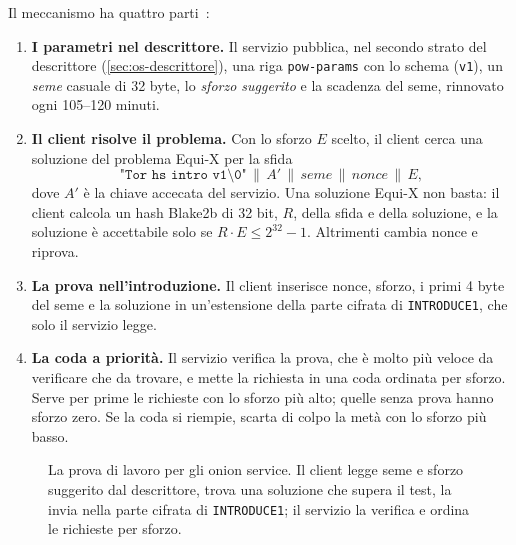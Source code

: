 Il meccanismo ha quattro parti~:
\begin{enumerate}
  \item \textbf{I parametri nel descrittore.} Il servizio pubblica, nel secondo strato del descrittore (\cref{sec:os-descrittore}), una riga \texttt{pow-params} con lo schema (\texttt{v1}), un \emph{seme} casuale di 32 byte, lo \emph{sforzo suggerito} e la scadenza del seme, rinnovato ogni 105--120 minuti.
  \item \textbf{Il client risolve il problema.} Con lo sforzo $E$ scelto, il client cerca una soluzione del problema Equi-X per la sfida
  \[ \texttt{"Tor hs intro v1\textbackslash 0"} \,\|\, A' \,\|\, \mathit{seme} \,\|\, \mathit{nonce} \,\|\, E, \]
  dove $A'$ è la chiave accecata del servizio. Una soluzione Equi-X non basta: il client calcola un hash Blake2b di 32 bit, $R$, della sfida e della soluzione, e la soluzione è accettabile solo se $R \cdot E \le 2^{32} - 1$. Altrimenti cambia nonce e riprova.
  \item \textbf{La prova nell'introduzione.} Il client inserisce nonce, sforzo, i primi 4 byte del seme e la soluzione in un'estensione della parte cifrata di \texttt{INTRODUCE1}, che solo il servizio legge.
  \item \textbf{La coda a priorità.} Il servizio verifica la prova, che è molto più veloce da verificare che da trovare, e mette la richiesta in una coda ordinata per sforzo. Serve per prime le richieste con lo sforzo più alto; quelle senza prova hanno sforzo zero. Se la coda si riempie, scarta di colpo la metà con lo sforzo più basso.
\end{enumerate}

\begin{figure}[htbp]
\centering

\caption{La prova di lavoro per gli onion service. Il client legge seme e sforzo suggerito dal descrittore, trova una soluzione che supera il test, la invia nella parte cifrata di \texttt{INTRODUCE1}; il servizio la verifica e ordina le richieste per sforzo.}
\label{fig:pow}
\end{figure}

